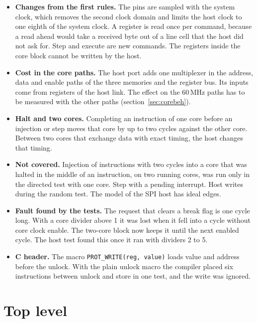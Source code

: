 \documentclass[10pt,a4paper]{article}
\begin{document}
\begin{itemize}
\item \textbf{Changes from the first rules.} The pins are sampled with the system clock, which removes the
second clock domain and limits the host clock to one eighth of the system clock. A register is read once per
command, because a read ahead would take a received byte out of a line cell that the host did not ask for.
Step and execute are new commands. The registers inside the core block cannot be written by the host.
\item \textbf{Cost in the core paths.} The host port adds one multiplexer in the address, data and enable paths of
the three memories and the register bus. Its inputs come from registers of the host link. The effect on the
60\,MHz paths has to be measured with the other paths (section~\ref{sec:corebeh}).
\item \textbf{Halt and two cores.} Completing an instruction of one core before an injection or step moves that
core by up to two cycles against the other core. Between two cores that exchange data with exact timing, the
host changes that timing.
\item \textbf{Not covered.} Injection of instructions with two cycles into a core that was halted in the middle
of an instruction, on two running cores, was run only in the directed test with one core. Step with a
pending interrupt. Host writes during the random test. The model of the SPI host has ideal edges.
\item \textbf{Fault found by the tests.} The request that clears a break flag is one cycle long. With a core divider above 1 it was lost when it fell into a cycle without core clock enable. The two-core block now keeps it until the next enabled cycle. The host test found this once it ran with dividers 2 to 5.
\item \textbf{C header.} The macro \texttt{PROT\_WRITE(reg, value)} loads value and address before the unlock. With
the plain unlock macro the compiler placed six instructions between unlock and store in one test, and the
write was ignored.
\end{itemize}

\section{Top level}\label{sec:top}
\end{document}
